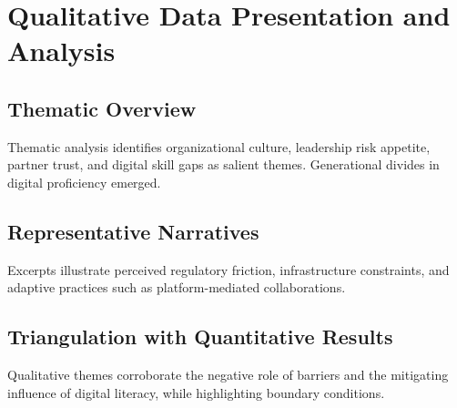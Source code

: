 \chapter{Qualitative Data Presentation and Analysis}\label{ch:qual}

\section{Thematic Overview}
Thematic analysis identifies organizational culture, leadership risk appetite, partner trust, and digital skill gaps as salient themes. Generational divides in digital proficiency emerged.

\section{Representative Narratives}
Excerpts illustrate perceived regulatory friction, infrastructure constraints, and adaptive practices such as platform-mediated collaborations.

\section{Triangulation with Quantitative Results}
Qualitative themes corroborate the negative role of barriers and the mitigating influence of digital literacy, while highlighting boundary conditions.
